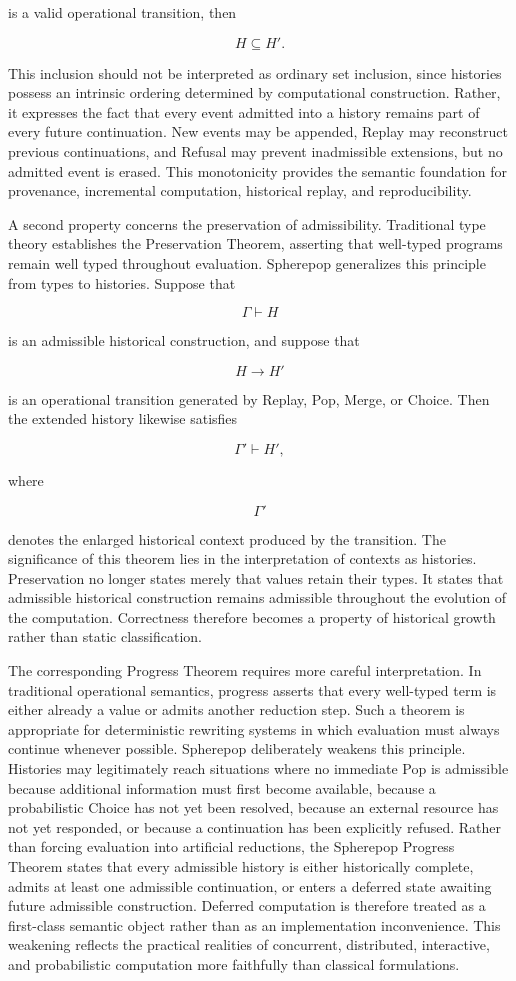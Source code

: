 \documentclass[12pt,oneside]{article}
\theoremstyle{definition}
\theoremstyle{remark}
\begin{document}
is a valid operational transition, then

\[
H
\subseteq
H'.
\]

This inclusion should not be interpreted as ordinary set inclusion, since
histories possess an intrinsic ordering determined by computational
construction. Rather, it expresses the fact that every event admitted into a
history remains part of every future continuation. New events may be appended,
Replay may reconstruct previous continuations, and Refusal may prevent
inadmissible extensions, but no admitted event is erased. This monotonicity
provides the semantic foundation for provenance, incremental computation,
historical replay, and reproducibility.

A second property concerns the preservation of admissibility. Traditional type
theory establishes the Preservation Theorem, asserting that well-typed
programs remain well typed throughout evaluation. Spherepop generalizes this
principle from types to histories. Suppose that

\[
\Gamma \vdash H
\]

is an admissible historical construction, and suppose that

\[
H
\longrightarrow
H'
\]

is an operational transition generated by Replay, Pop, Merge, or Choice. Then
the extended history likewise satisfies

\[
\Gamma'
\vdash
H',
\]

where

\[
\Gamma'
\]

denotes the enlarged historical context produced by the transition. The
significance of this theorem lies in the interpretation of contexts as
histories. Preservation no longer states merely that values retain their
types. It states that admissible historical construction remains admissible
throughout the evolution of the computation. Correctness therefore becomes a
property of historical growth rather than static classification.

The corresponding Progress Theorem requires more careful interpretation. In
traditional operational semantics, progress asserts that every well-typed term
is either already a value or admits another reduction step. Such a theorem is
appropriate for deterministic rewriting systems in which evaluation must
always continue whenever possible. Spherepop deliberately weakens this
principle. Histories may legitimately reach situations where no immediate Pop
is admissible because additional information must first become available,
because a probabilistic Choice has not yet been resolved, because an external
resource has not yet responded, or because a continuation has been explicitly
refused. Rather than forcing evaluation into artificial reductions, the
Spherepop Progress Theorem states that every admissible history is either
historically complete, admits at least one admissible continuation, or enters
a deferred state awaiting future admissible construction. Deferred computation
is therefore treated as a first-class semantic object rather than as an
implementation inconvenience. This weakening reflects the practical realities
of concurrent, distributed, interactive, and probabilistic computation more
faithfully than classical formulations.
\end{document}
